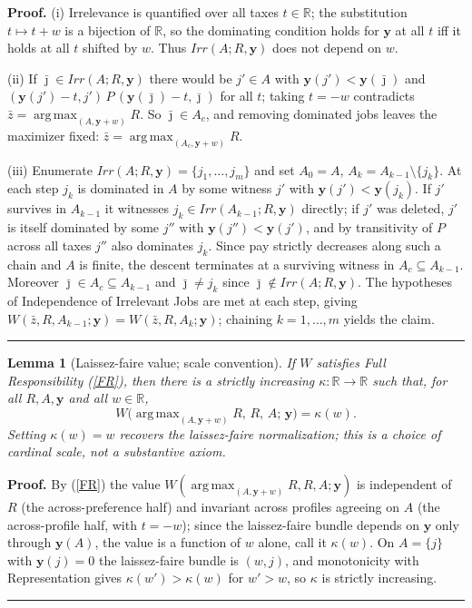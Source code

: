 \documentclass[12pt,thmsb]{article}
\DeclareMathOperator*{\argmax}{arg\,max}
\newtheorem{lemma}{Lemma}
\newenvironment{proof}[1][Proof]{\noindent \textbf{#1.} }{\  \rule{0.5em}{0.5em}}
\begin{document}
\begin{proof}
(i) Irrelevance is quantified over all taxes $t\in\mathbb R$; the substitution
$t\mapsto t+w$ is a bijection of $\mathbb R$, so the dominating condition holds
for $\mathbf y$ at all $t$ iff it holds at all $t$ shifted by $w$. Thus
$Irr(A;R,\mathbf y)$ does not depend on $w$.

(ii) If $\bar\jmath\in Irr(A;R,\mathbf y)$ there would be $j'\in A$ with
$\mathbf y(j')<\mathbf y(\bar\jmath)$ and
$(\mathbf y(j')-t,j')\,P\,(\mathbf y(\bar\jmath)-t,\bar\jmath)$ for all $t$;
taking $t=-w$ contradicts $\bar z=\argmax_{(A,\mathbf y+w)}R$. So
$\bar\jmath\in A_c$, and removing dominated jobs leaves the maximizer fixed:
$\bar z=\argmax_{(A_c,\mathbf y+w)}R$.

(iii) Enumerate $Irr(A;R,\mathbf y)=\{j_1,\dots,j_m\}$ and set $A_0=A$,
$A_k=A_{k-1}\setminus\{j_k\}$. At each step $j_k$ is dominated in $A$ by some
witness $j'$ with $\mathbf y(j')<\mathbf y(j_k)$. If $j'$ survives in
$A_{k-1}$ it witnesses $j_k\in Irr(A_{k-1};R,\mathbf y)$ directly; if $j'$ was
deleted, $j'$ is itself dominated by some $j''$ with
$\mathbf y(j'')<\mathbf y(j')$, and by transitivity of $P$ across all taxes
$j''$ also dominates $j_k$. Since pay strictly decreases along such a chain and
$A$ is finite, the descent terminates at a surviving witness in
$A_c\subseteq A_{k-1}$. Moreover $\bar\jmath\in A_c\subseteq A_{k-1}$ and
$\bar\jmath\neq j_k$ since $\bar\jmath\notin Irr(A;R,\mathbf y)$. The hypotheses
of Independence of Irrelevant Jobs are met at each step, giving
$W(\bar z,R,A_{k-1};\mathbf y)=W(\bar z,R,A_k;\mathbf y)$; chaining
$k=1,\dots,m$ yields the claim.
\end{proof}

\begin{lemma}[Laissez-faire value; scale convention]
\label{lem:w3value}
If $W$ satisfies Full Responsibility (\ref{FR}), then there is a strictly
increasing $\kappa:\mathbb R\to\mathbb R$ such that, for all $R,A,\mathbf y$ and
all $w\in\mathbb R$,
\begin{equation*}
W\!\big(\argmax_{(A,\mathbf y+w)}R,\,R,\,A;\,\mathbf y\big)=\kappa(w).
\end{equation*}
Setting $\kappa(w)=w$ recovers the laissez-faire normalization; this is a choice
of cardinal scale, not a substantive axiom.
\end{lemma}

\begin{proof}
By (\ref{FR}) the value $W(\argmax_{(A,\mathbf y+w)}R,R,A;\mathbf y)$ is
independent of $R$ (the across-preference half) and invariant across profiles
agreeing on $A$ (the across-profile half, with $t=-w$); since the laissez-faire
bundle depends on $\mathbf y$ only through $\mathbf y(A)$, the value is a
function of $w$ alone, call it $\kappa(w)$. On $A=\{j\}$ with $\mathbf y(j)=0$
the laissez-faire bundle is $(w,j)$, and monotonicity with Representation gives
$\kappa(w')>\kappa(w)$ for $w'>w$, so $\kappa$ is strictly increasing.
\end{proof}
\end{document}
